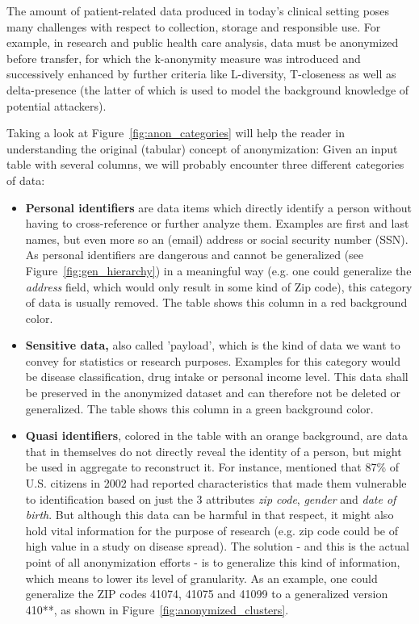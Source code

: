 	The amount of patient-related data produced in today’s clinical setting poses many challenges with respect to collection, storage and responsible use. For example, in research and public health care analysis, data must be anonymized before transfer, for which the k-anonymity measure was introduced and successively enhanced by further criteria like L-diversity, T-closeness as well as delta-presence (the latter of which is used to model the background knowledge of potential attackers).
	
	Taking a look at Figure~\ref{fig:anon_categories} will help the reader in understanding the original (tabular) concept of anonymization: Given an input table with several columns, we will probably encounter three different categories of data:
	
	\begin{itemize}
		\item \textbf{Personal identifiers} are data items which directly identify a person without having to cross-reference or further analyze them. Examples are first and last names, but even more so an (email) address or social security number (SSN). As personal identifiers are dangerous and cannot be generalized (see Figure~\ref{fig:gen_hierarchy}) in a meaningful way (e.g. one could generalize the \textit{address} field, which would only result in some kind of Zip code), this category of data is usually removed. The table shows this column in a red background color.
		\item \textbf{Sensitive data,} also called 'payload', which is the kind of data we want to convey for statistics or research purposes. Examples for this category would be disease classification, drug intake or personal income level. This data shall be preserved in the anonymized dataset and can therefore not be deleted or generalized. The table shows this column in a green background color.
		\item \textbf{Quasi identifiers}, colored in the table with an orange background, are data that in themselves do not directly reveal the identity of a person, but might be used in aggregate to reconstruct it. For instance, \citep{sweeney2002k} mentioned that 87\% of U.S. citizens in 2002 had reported characteristics that made them vulnerable to identification based on just the 3 attributes \textit{zip code}, \textit{gender} and \textit{date of birth}. But although this data can be harmful in that respect, it might also hold vital information for the purpose of research (e.g. zip code could be of high value in a study on disease spread). The solution - and this is the actual point of all anonymization efforts - is to generalize this kind of information, which means to lower its level of granularity. As an example, one could generalize the ZIP codes 41074, 41075 and 41099 to a generalized version 410**, as shown in Figure~\ref{fig:anonymized_clusters}.
	\end{itemize}
	
